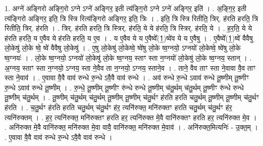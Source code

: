 \documentclass[17pt]{extarticle}
\begin{document}
1. अग्ने॑ अङ्गिरो अङ्गि॒रो ऽग्ने ऽग्ने॑ अङ्गिर॒ इती त्य॑ङ्गि॒रो ऽग्ने ऽग्ने॑ अङ्गिर॒ इति॑ । . अ॒ङ्गि॒र॒ इती त्य॑ङ्गिरो अङ्गिर॒ इति॒ त्रि स्त्रि रित्य॑ङ्गिरो अङ्गिर॒ इति॒ त्रिः । . इति॒ त्रि स्त्रि रितीति॒ त्रिर्. ह॑रति हरति॒ त्रि रितीति॒ त्रिर्. ह॑रति । . त्रिर्. ह॑रति हरति॒ त्रि स्त्रिर्. ह॑रति॒ ये ये ह॑रति॒ त्रि स्त्रिर्. ह॑रति॒ ये । . ह॒र॒ति॒ ये ये ह॑रति हरति॒ य ए॒वैव ये ह॑रति हरति॒ य ए॒व । . य ए॒वैव ये य ए॒वैष्वे᳚(1॒)ष्वे॑व ये य ए॒वैषु । . ए॒वैष्वे᳚(1॒)ष्वे॑ वैवैषु लो॒केषु॑ लो॒के ष्वे॒ ष्वे॑ वैवैषु लो॒केषु॑ । . ए॒षु लो॒केषु॑ लो॒केष्वे॒ ष्वे॑षु लो॒के ष्व॒ग्नयो॒ ऽग्नयो॑ लो॒केष्वे॒ ष्वे॑षु लो॒के ष्व॒ग्नयः॑ । . लो॒के ष्व॒ग्नयो॒ ऽग्नयो॑ लो॒केषु॑ लो॒के ष्व॒ग्नय॒ स्ताꣳ स्ता न॒ग्नयो॑ लो॒केषु॑ लो॒के ष्व॒ग्नय॒ स्तान् । . अ॒ग्नय॒ स्ताꣳ स्ता न॒ग्नयो॒ ऽग्नय॒ स्ता ने॒वैव ता न॒ग्नयो॒ ऽग्नय॒ स्ताने॒व । . ताने॒ वैव ताꣳ स्ता ने॒वावा वै॒व ताꣳ स्ता ने॒वाव॑ । . ए॒वावा वै॒वै वाव॑ रुन्धे रु॒न्धे ऽवै॒वै वाव॑ रुन्धे । . अव॑ रुन्धे रु॒न्धे ऽवाव॑ रुन्धे तू॒ष्णीम् तू॒ष्णीꣳ रु॒न्धे ऽवाव॑ रुन्धे तू॒ष्णीम् । . रु॒न्धे॒ तू॒ष्णीम् तू॒ष्णीꣳ रु॑न्धे रुन्धे तू॒ष्णीम् च॑तु॒र्थम् च॑तु॒र्थम् तू॒ष्णीꣳ रु॑न्धे रुन्धे तू॒ष्णीम् च॑तु॒र्थम् । . तू॒ष्णीम् च॑तु॒र्थम् च॑तु॒र्थम् तू॒ष्णीम् तू॒ष्णीम् च॑तु॒र्थꣳ ह॑रति हरति चतु॒र्थम् तू॒ष्णीम् तू॒ष्णीम् च॑तु॒र्थꣳ ह॑रति । . च॒तु॒र्थꣳ ह॑रति हरति चतु॒र्थम् च॑तु॒र्थꣳ ह॑र॒ त्यनि॑रुक्त॒ मनि॑रुक्तꣳ हरति चतु॒र्थम् च॑तु॒र्थꣳ ह॑र॒ त्यनि॑रुक्तम् । . ह॒र॒ त्यनि॑रुक्त॒ मनि॑रुक्तꣳ हरति हर॒ त्यनि॑रुक्त मे॒वै वानि॑रुक्तꣳ हरति हर॒ त्यनि॑रुक्त मे॒व । . अनि॑रुक्त मे॒वै वानि॑रुक्त॒ मनि॑रुक्त मे॒वा वावै॒ वानि॑रुक्त॒ मनि॑रुक्त मे॒वाव॑ । . अनि॑रुक्त॒मित्यनिः॑ - उ॒क्त॒म् । . ए॒वावा वै॒वै वाव॑ रुन्धे रु॒न्धे ऽवै॒वै वाव॑ रुन्धे । \newline
\end{document}
